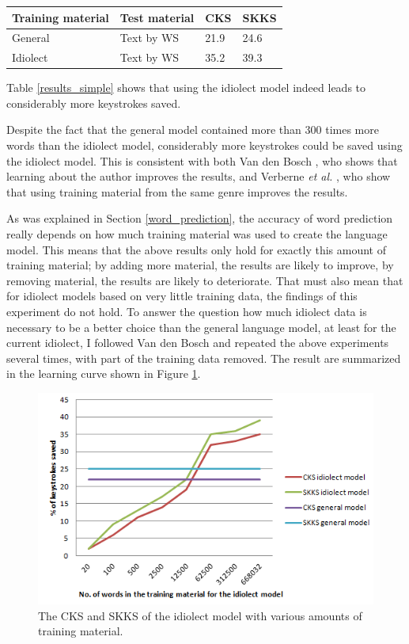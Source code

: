 \documentclass[11pt]{article}
\let\originaltable\table
\let\endoriginaltable\endtable
\renewenvironment{table}[1][ht]{%
  \originaltable[#1]
  \centering}%
  {\endoriginaltable}
\begin{document}
\begin{table}[H]
\begin{tabular}{ll|ll} 
Training material&Test material&CKS&SKKS\\
\hline
General &Text by WS&21.9&24.6\\
Idiolect&Text by WS&35.2&39.3\\
\end{tabular} 
\caption{Percentage of keystrokes that can be saved when using the general and the idiolect model} \label{results_simple}
\end{table}

Table \ref{results_simple} shows that  using the idiolect model indeed leads to considerably more keystrokes saved. 

Despite the fact that the general model contained more than 300 times more words than the idiolect model, considerably more keystrokes could be saved using the idiolect model. This is consistent with both Van den Bosch , who shows that learning about the author improves the results, and Verberne {\em et al.} , who show that using training material from the same genre improves the results.

As was explained in Section \ref{word_prediction}, the accuracy of word prediction really depends on how much training material was used to create the language model. This means that the above results only hold for exactly this amount of training material; by adding more material, the results are likely to improve, by removing material, the results are likely to deteriorate. That must also mean that for idiolect models based on very little training data, the findings of this experiment do not hold. To answer the question how much idiolect data is necessary to be a better choice than the general language model, at least for the current idiolect, I followed Van den Bosch  and repeated the above experiments several times, with part of the training data removed. The result are summarized in the learning curve shown in Figure \ref{lcurve}.

\begin{figure}[H] \centering
\includegraphics[scale=1]{lcurve}
\caption{The CKS and SKKS of the idiolect model with various amounts of training material.}
\label{lcurve}
\end{figure} 
\end{document}
